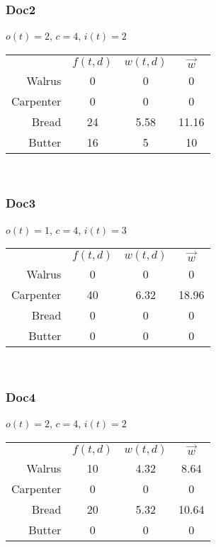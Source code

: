 \documentclass{article}
\begin{document}
\subsubsection*{Doc2}
$o(t) = 2$, $c = 4$, $i(t) = 2$

\begin{tabular}{r c c c}
\multicolumn{1}{r}{}
 & \multicolumn{1}{c}{$f(t,d)$}
 & \multicolumn{1}{c}{$w(t,d)$}
 & \multicolumn{1}{c}{$\vec{w}$} \\
\cline{2-4}
Walrus & 0 & 0 & 0 \\
\cline{2-4}
Carpenter & 0 & 0 & 0 \\
\cline{2-4}
Bread & 24 & 5.58 & 11.16 \\
\cline{2-4}
Butter & 16 & 5 & 10 \\
\cline{2-4}
\end{tabular} \\

\subsubsection*{Doc3}
$o(t) = 1$, $c = 4$, $i(t) = 3$

\begin{tabular}{r c c c}
\multicolumn{1}{r}{}
 & \multicolumn{1}{c}{$f(t,d)$}
 & \multicolumn{1}{c}{$w(t,d)$}
 & \multicolumn{1}{c}{$\vec{w}$} \\
\cline{2-4}
Walrus & 0 & 0 & 0 \\
\cline{2-4}
Carpenter & 40 & 6.32 & 18.96 \\
\cline{2-4}
Bread & 0 & 0 & 0 \\
\cline{2-4}
Butter & 0 & 0 & 0 \\
\cline{2-4}
\end{tabular} \\

\subsubsection*{Doc4}
$o(t) = 2$, $c = 4$, $i(t) = 2$

\begin{tabular}{r c c c}
\multicolumn{1}{r}{}
 & \multicolumn{1}{c}{$f(t,d)$}
 & \multicolumn{1}{c}{$w(t,d)$}
 & \multicolumn{1}{c}{$\vec{w}$} \\
\cline{2-4}
Walrus & 10 & 4.32 & 8.64 \\
\cline{2-4}
Carpenter & 0 & 0 & 0 \\
\cline{2-4}
Bread & 20 & 5.32 & 10.64 \\
\cline{2-4}
Butter & 0 & 0 & 0 \\
\cline{2-4}
\end{tabular} \\
\end{document}
